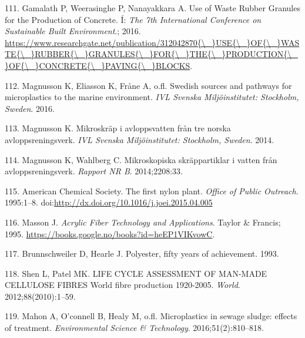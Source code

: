 \documentclass[icelandic,]{book}
\begin{document}
\leavevmode\hypertarget{ref-Gamalath2016}{}%
111. Gamalath P, Weerasinghe P, Nanayakkara A. Use of Waste Rubber Granules for the Production of Concrete. Í: \emph{The 7th International Conference on Sustainable Built Environment}.; 2016. \href{https://www.researchgate.net/publication/312042870\%7B/_\%7DUSE\%7B/_\%7DOF\%7B/_\%7DWASTE\%7B/_\%7DRUBBER\%7B/_\%7DGRANULES\%7B/_\%7DFOR\%7B/_\%7DTHE\%7B/_\%7DPRODUCTION\%7B/_\%7DOF\%7B/_\%7DCONCRETE\%7B/_\%7DPAVING\%7B/_\%7DBLOCKS}{https://www.researchgate.net/publication/312042870\{\textbackslash{}\_\}USE\{\textbackslash{}\_\}OF\{\textbackslash{}\_\}WASTE\{\textbackslash{}\_\}RUBBER\{\textbackslash{}\_\}GRANULES\{\textbackslash{}\_\}FOR\{\textbackslash{}\_\}THE\{\textbackslash{}\_\}PRODUCTION\{\textbackslash{}\_\}OF\{\textbackslash{}\_\}CONCRETE\{\textbackslash{}\_\}PAVING\{\textbackslash{}\_\}BLOCKS}.

\leavevmode\hypertarget{ref-magnusson2016swedish}{}%
112. Magnusson K, Eliasson K, Fråne A, o.fl. Swedish sources and pathways for microplastics to the marine environment. \emph{IVL Svenska Miljöinstitutet: Stockholm, Sweden}. 2016.

\leavevmode\hypertarget{ref-magnusson2014mikroskrap}{}%
113. Magnusson K. Mikroskräp i avloppsvatten från tre norska avloppsreningsverk. \emph{IVL Svenska Miljöinstitutet: Stockholm, Sweden}. 2014.

\leavevmode\hypertarget{ref-magnusson2014mikroskopiska}{}%
114. Magnusson K, Wahlberg C. Mikroskopiska skräppartiklar i vatten från avloppsreningsverk. \emph{Rapport NR B}. 2014;2208:33.

\leavevmode\hypertarget{ref-AmericanChemicalSociety1995}{}%
115. American Chemical Society. The first nylon plant. \emph{Office of Public Outreach}. 1995:1--8. doi:\href{https://doi.org/http://dx.doi.org/10.1016/j.joei.2015.04.005}{http://dx.doi.org/10.1016/j.joei.2015.04.005}

\leavevmode\hypertarget{ref-masson1995acrylic}{}%
116. Masson J. \emph{Acrylic Fiber Technology and Applications}. Taylor \& Francis; 1995. \url{https://books.google.no/books?id=heEP1VIKvowC}.

\leavevmode\hypertarget{ref-brunnschweiler1993polyester}{}%
117. Brunnschweiler D, Hearle J. Polyester, fifty years of achievement. 1993.

\leavevmode\hypertarget{ref-Shen2012}{}%
118. Shen L, Patel MK. LIFE CYCLE ASSESSMENT OF MAN-MADE CELLULOSE FIBRES World fibre production 1920-2005. \emph{World}. 2012;88(2010):1--59.

\leavevmode\hypertarget{ref-mahon2016microplastics}{}%
119. Mahon A, O'connell B, Healy M, o.fl. Microplastics in sewage sludge: effects of treatment. \emph{Environmental Science \& Technology}. 2016;51(2):810--818.
\end{document}
